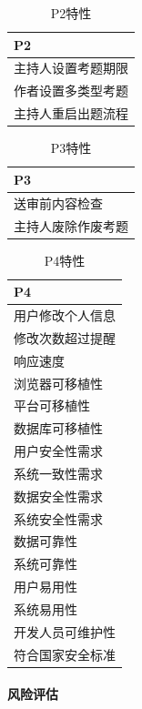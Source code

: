 \documentclass[hyperref, a4paper]{ctexart}
\let\oldparagraph\paragraph
\renewcommand{\paragraph}[1]{\oldparagraph{#1}\mbox{}}
\begin{document}
\begin{table}[h]
\centering
\caption{P2特性}
\begin{tabular}{|p{10cm}|}
\hline
P2\\
\hline
主持人设置考题期限\\
\hline
作者设置多类型考题\\
\hline
主持人重启出题流程\\
\hline
\end{tabular}
\end{table}

\begin{table}
\centering
\caption{P3特性}
\begin{tabular}{|p{10cm}|}
\hline
P3\\
\hline
送审前内容检查\\
\hline
主持人废除作废考题\\
\hline
\end{tabular}
\end{table}

\begin{table}
\centering
\caption{P4特性}
\begin{tabular}{|p{10cm}|}
\hline
P4\\
\hline
用户修改个人信息\\
\hline
修改次数超过提醒\\
\hline
响应速度\\
\hline
浏览器可移植性\\
\hline
平台可移植性\\
\hline
数据库可移植性\\
\hline
用户安全性需求\\
\hline
系统一致性需求\\
\hline
数据安全性需求\\
\hline
系统安全性需求\\
\hline
数据可靠性\\
\hline
系统可靠性\\
\hline
用户易用性\\
\hline
系统易用性\\
\hline
开发人员可维护性\\
\hline
符合国家安全标准\\
\hline
\end{tabular}
\end{table}

\hypertarget{ux98ceux9669ux8bc4ux4f30}{%
\paragraph{风险评估}\label{ux98ceux9669ux8bc4ux4f30}}
\end{document}
